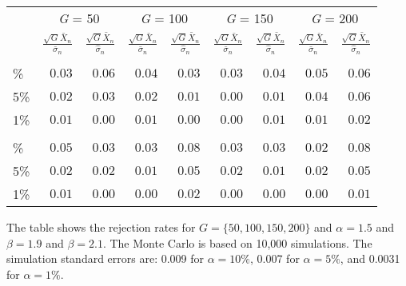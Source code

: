 \setlength{\LTpost}{0mm}
\begin{longtable}{l|rrrrrrrr}
\toprule
\multicolumn{1}{l}{} & \multicolumn{2}{c}{\emph{G} = 50} & \multicolumn{2}{c}{\emph{G} = 100} & \multicolumn{2}{c}{\emph{G} = 150} & \multicolumn{2}{c}{\emph{G} = 200} \\ 
\cmidrule(lr){2-3} \cmidrule(lr){4-5} \cmidrule(lr){6-7} \cmidrule(lr){8-9}
\multicolumn{1}{l}{} & \(\frac{\sqrt{G}\bar{X}_{n}}{\bar{\sigma}_{n}}\) & \(\frac{\sqrt{G}\bar{X}_{n}}{\hat{\sigma}_{n}}\) & \(\frac{\sqrt{G}\bar{X}_{n}}{\bar{\sigma}_{n}}\) & \(\frac{\sqrt{G}\bar{X}_{n}}{\hat{\sigma}_{n}}\) & \(\frac{\sqrt{G}\bar{X}_{n}}{\bar{\sigma}_{n}}\) & \(\frac{\sqrt{G}\bar{X}_{n}}{\hat{\sigma}_{n}}\) & \(\frac{\sqrt{G}\bar{X}_{n}}{\bar{\sigma}_{n}}\) & \(\frac{\sqrt{G}\bar{X}_{n}}{\hat{\sigma}_{n}}\) \\ 
\midrule\addlinespace[2.5pt]
\multicolumn{9}{l}{\(\alpha=1.5, \beta=1.9\)} \\ 
\midrule\addlinespace[2.5pt]
10\% & $0.03$ & $0.06$ & $0.04$ & $0.03$ & $0.03$ & $0.04$ & $0.05$ & $0.06$ \\ 
5\% & $0.02$ & $0.03$ & $0.02$ & $0.01$ & $0.00$ & $0.01$ & $0.04$ & $0.06$ \\ 
1\% & $0.01$ & $0.00$ & $0.01$ & $0.00$ & $0.00$ & $0.01$ & $0.01$ & $0.02$ \\ 
\midrule\addlinespace[2.5pt]
\multicolumn{9}{l}{\(\alpha=1.5, \beta=2.1\)} \\ 
\midrule\addlinespace[2.5pt]
10\% & $0.05$ & $0.03$ & $0.03$ & $0.08$ & $0.03$ & $0.03$ & $0.02$ & $0.08$ \\ 
5\% & $0.02$ & $0.02$ & $0.01$ & $0.05$ & $0.02$ & $0.01$ & $0.02$ & $0.05$ \\ 
1\% & $0.01$ & $0.00$ & $0.00$ & $0.02$ & $0.00$ & $0.00$ & $0.00$ & $0.01$ \\ 
\bottomrule
\end{longtable}
\begin{minipage}{\linewidth}
The table shows the rejection rates for \(G=\{50,100,150,200\}\) and \(\alpha=1.5\) and \(\beta=1.9\) and \(\beta=2.1\). The Monte Carlo is based on 10,000 simulations. The simulation standard errors are: 0.009 for \(\alpha=10\%\), 0.007 for \(\alpha=5\%\), and 0.0031 for \(\alpha=1\%\).\\
\end{minipage}


